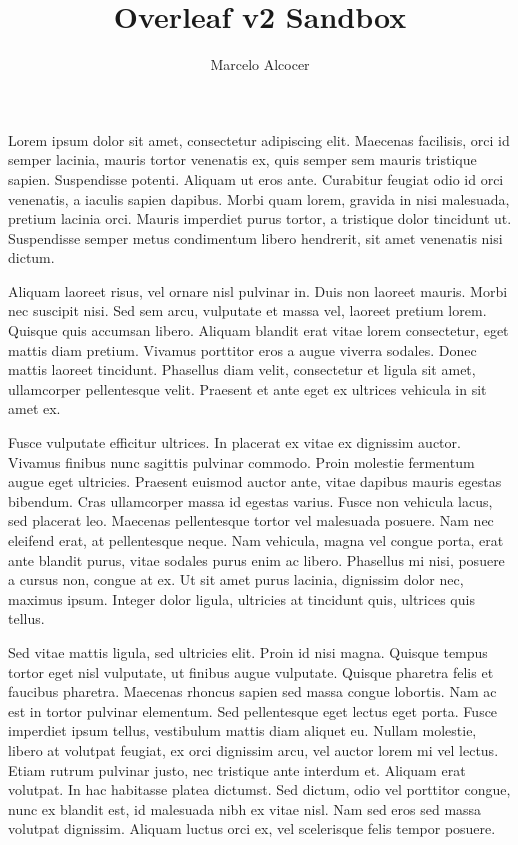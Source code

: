 \documentclass{article}
\title{Overleaf v2 Sandbox}
\author{Marcelo Alcocer}
\begin{document}
\maketitle

Lorem ipsum dolor sit amet, consectetur adipiscing elit. Maecenas facilisis, orci id semper lacinia, mauris tortor venenatis ex, quis semper sem mauris tristique sapien. Suspendisse potenti. Aliquam ut eros ante. Curabitur feugiat odio id orci venenatis, a iaculis sapien dapibus. Morbi quam lorem, gravida in nisi malesuada, pretium lacinia orci. Mauris imperdiet purus tortor, a tristique dolor tincidunt ut. Suspendisse semper metus condimentum libero hendrerit, sit amet venenatis nisi dictum.

Aliquam laoreet risus, vel ornare nisl pulvinar in. Duis non laoreet mauris. Morbi nec suscipit nisi. Sed sem arcu, vulputate et massa vel, laoreet pretium lorem. Quisque quis accumsan libero. Aliquam blandit erat vitae lorem consectetur, eget mattis diam pretium. Vivamus porttitor eros a augue viverra sodales. Donec mattis laoreet tincidunt. Phasellus diam velit, consectetur et ligula sit amet, ullamcorper pellentesque velit. Praesent et ante eget ex ultrices vehicula in sit amet ex.

Fusce vulputate efficitur ultrices. In placerat ex vitae ex dignissim auctor. Vivamus finibus nunc sagittis pulvinar commodo. Proin molestie fermentum augue eget ultricies. Praesent euismod auctor ante, vitae dapibus mauris egestas bibendum. Cras ullamcorper massa id egestas varius. Fusce non vehicula lacus, sed placerat leo. Maecenas pellentesque tortor vel malesuada posuere. Nam nec eleifend erat, at pellentesque neque. Nam vehicula, magna vel congue porta, erat ante blandit purus, vitae sodales purus enim ac libero. Phasellus mi nisi, posuere a cursus non, congue at ex. Ut sit amet purus lacinia, dignissim dolor nec, maximus ipsum. Integer dolor ligula, ultricies at tincidunt quis, ultrices quis tellus.

Sed vitae mattis ligula, sed ultricies elit. Proin id nisi magna. Quisque tempus tortor eget nisl vulputate, ut finibus augue vulputate. Quisque pharetra felis et faucibus pharetra. Maecenas rhoncus sapien sed massa congue lobortis. Nam ac est in tortor pulvinar elementum. Sed pellentesque eget lectus eget porta. Fusce imperdiet ipsum tellus, vestibulum mattis diam aliquet eu. Nullam molestie, libero at volutpat feugiat, ex orci dignissim arcu, vel auctor lorem mi vel lectus. Etiam rutrum pulvinar justo, nec tristique ante interdum et. Aliquam erat volutpat. In hac habitasse platea dictumst. Sed dictum, odio vel porttitor congue, nunc ex blandit est, id malesuada nibh ex vitae nisl. Nam sed eros sed massa volutpat dignissim. Aliquam luctus orci ex, vel scelerisque felis tempor posuere.
\end{document}
